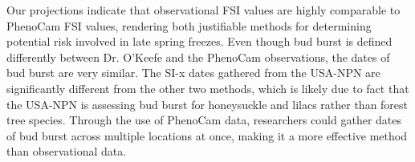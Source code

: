 \documentclass{article}\usepackage[]{graphicx}\usepackage[]{color}
\begin{document}
Our projections indicate that observational FSI values are highly comparable to PhenoCam FSI values, rendering both justifiable methods for determining potential risk involved in late spring freezes. Even though bud burst is defined differently between Dr. O'Keefe and the PhenoCam observations, the dates of bud burst are very similar. The SI-x dates gathered from the USA-NPN are significantly different from the other two methods, which is likely due to fact that the USA-NPN is assessing bud burst for honeysuckle and lilacs rather than forest tree species. Through the use of PhenoCam data, researchers could gather dates of bud burst across multiple locations at once, making it a more effective method than observational data. 

\newpage

\end{document}
